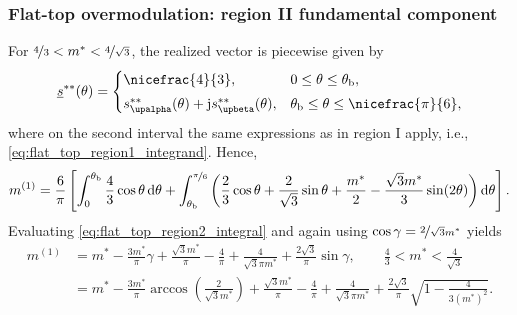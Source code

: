\begin{frame}
    \frametitle{Flat-top overmodulation: region II fundamental component}
    For \(\nicefrac{4}{3}<m^*<\nicefrac{4}{\sqrt{3}}\), the realized vector is piecewise given by
    \begin{equation}
        \underline{s}^{**}(\theta)=
        \begin{cases}
            \nicefrac{4}{3},                                              & 0\leq \theta\leq \theta_\mathrm{b},                 \\[1mm]
            s_{\upalpha}^{**}(\theta)+\mathrm{j}s_{\upbeta}^{**}(\theta), & \theta_\mathrm{b}\leq \theta\leq \nicefrac{\pi}{6},
        \end{cases}
        \label{eq:flat_top_region2_piecewise_vector}
    \end{equation}
    where on the second interval the same expressions as in region I apply, i.e., \eqref{eq:flat_top_region1_integrand}. \pause
    Hence,
    \begin{equation}
        m^{(1)}=
        \frac{6}{\pi}
        \left[
            \int_{0}^{\theta_\mathrm{b}}\frac{4}{3}\cos\theta\,\mathrm{d}\theta
            +
            \int_{\theta_\mathrm{b}}^{\nicefrac{\pi}{6}}
            \left(
            \frac{2}{3}\cos\theta+\frac{2}{\sqrt{3}}\sin\theta+\frac{m^*}{2}-\frac{\sqrt{3}m^*}{3}\sin(2\theta)
            \right)\mathrm{d}\theta
            \right].
        \label{eq:flat_top_region2_integral}
    \end{equation}\pause
    Evaluating \eqref{eq:flat_top_region2_integral} and again using \(\cos\gamma=\nicefrac{2}{\sqrt{3}m^*}\) yields
    \begin{equation}
        \begin{split}
            m^{(1)}
             & =
            m^*
            -\frac{3m^*}{\pi}\gamma
            +\frac{\sqrt{3}m^*}{\pi}
            -\frac{4}{\pi}
            +\frac{4}{\sqrt{3}\pi m^*}
            +\frac{2\sqrt{3}}{\pi}\sin\gamma,
            \qquad
            \frac{4}{3}<m^*<\frac{4}{\sqrt{3}} \\
             & =
            m^*
            -\frac{3m^*}{\pi}\arccos\!\left(\frac{2}{\sqrt{3}m^*}\right)
            +\frac{\sqrt{3}m^*}{\pi}
            -\frac{4}{\pi}
            +\frac{4}{\sqrt{3}\pi m^*}
            +\frac{2\sqrt{3}}{\pi}\sqrt{1-\frac{4}{3(m^*)^2}}.
        \end{split}
        \label{eq:flat_top_region2_closed_form}
    \end{equation}
\end{frame}

